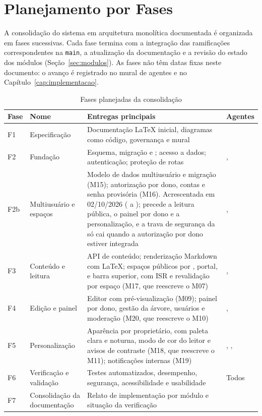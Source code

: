 \section{Planejamento por Fases}\label{sec:planejamento}

A consolidação do sistema em arquitetura monolítica documentada é organizada em fases sucessivas. Cada fase termina com a integração das ramificações correspondentes na \texttt{main}, a atualização da documentação e a revisão do estado dos módulos (Seção~\ref{sec:modulos}). As fases não têm datas fixas neste documento: o avanço é registrado no mural de agentes e no Capítulo~\ref{cap:implementacao}.

\begin{table}[htb]
\caption{Fases planejadas da consolidação}\label{tab:fases}
\small
\begin{tabularx}{\linewidth}{@{}L{1.1cm}L{4.2cm}YL{2.8cm}@{}}
\toprule
\textbf{Fase} & \textbf{Nome} & \textbf{Entregas principais} & \textbf{Agentes}\\
\midrule
F1 & Especificação & Documentação \LaTeX{} inicial, diagramas como código, governança e mural & \\
\addlinespace
F2 & Fundação & Esquema, migração e ; acesso a dados; autenticação; proteção de rotas & , \\
\addlinespace
F2b & Multiusuário e espaços & Modelo de dados multiusuário e migração (M15); autorização por dono, contas e senha provisória (M16). Acrescentada em 02/10/2026 ( a ); precede a leitura pública, o painel por dono e a personalização, e a trava de segurança da  só cai quando a autorização por dono estiver integrada & , \\
\addlinespace
F3 & Conteúdo e leitura & API de conteúdo; renderização Markdown com \LaTeX{}; espaços públicos por , portal,  e barra superior, com ISR e revalidação por espaço (M17, que reescreve o M07) & , \\
\addlinespace
F4 & Edição e painel & Editor com pré-visualização (M09); painel por dono, gestão da árvore, usuários e moderação (M20, que reescreve o M10) & , \\
\addlinespace
F5 & Personalização & Aparência por proprietário, com paleta clara e noturna, modo de cor do leitor e avisos de contraste (M18, que reescreve o M11); notificações internas (M19) & , , \\
\addlinespace
F6 & Verificação e validação & Testes automatizados, desempenho, segurança, acessibilidade e usabilidade & Todos\\
\addlinespace
F7 & Consolidação da documentação & Relato de implementação por módulo e situação da verificação & \\
\bottomrule
\end{tabularx}
\end{table}

